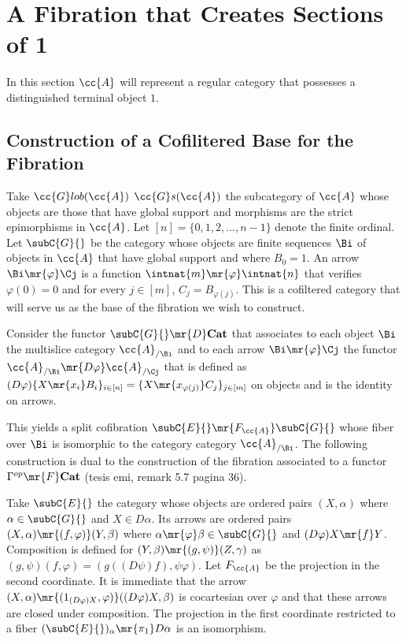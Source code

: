 

\section{A Fibration that Creates Sections of 1}
In this section $\cc{A}$ will represent a regular category that possesses a distinguished terminal object $1$.

\subsection{Construction of a Cofilitered Base for the Fibration}



Take $\cc{G}lob(\cc{A})$ $\cc{G}s(\cc{A})$ the subcategory of $\cc{A}$ whose objects are those that have global support and morphisms are the strict epimorphisms in $\cc{A}$. Let $[n]=\{0,1,2,...,n-1\}$ denote the finite ordinal. Let $\subC{G}{}$ be the category whose objects are finite sequences $\Bi$ of objects in $\cc{A}$ that have global support and where $B_0=1$. An arrow  ${\Bi \mr{\varphi} \Cj}$ is a function ${ \intnat{m} \mr{\varphi} \intnat{n}}$ that verifies ${\varphi(0)=0}$ and for every $j \in [m]$, ${C_j=B_{\varphi(j)}}$. This is a cofiltered category that will serve us as the base of the fibration we wish to construct. 

Consider the functor $\subC{G}{} \mr{D} \textbf{Cat}$ that associates to each object $\Bi$ the multislice category $\cc{A}_{/\Bi}$ and to each arrow ${\Bi \mr{\varphi} \Cj}$ the functor ${\cc{A}_{/\Bi} \mr{D\varphi} \cc{A}_{/\Cj}}$ that is defined as ${(D\varphi)\{X \mr{x_i} B_i\}_{i \in [n]}=\{X \mr{x_{\varphi(j)}} C_j\}_{j \in [m]}}$ on objects and is the identity on arrows.

\begin{remark}\label{obtuvimos una cofibracion}
This yields a split cofibration ${\subC{E}{} \mr{F_{\cc{A}}} \subC{G}{}}$ whose fiber over $\Bi$ is isomorphic to the category category $\cc{A}_{/\Bi}$. The following construction is dual to the construction of the fibration  associated to a functor ${\Gamma^{op} \mr{F} \textbf{Cat}}$ (tesis emi, remark 5.7 pagina 36). 

Take $\subC{E}{}$ the category whose objects are ordered pairs $(X,\alpha)$  where ${\alpha \in \subC{G}{}}$ and $X \in D\alpha$. Its arrows are ordered pairs ${(X,\alpha) \mr{(f,\varphi)} (Y,\beta)}$ where $\alpha \mr{\varphi} \beta \in \subC{G}{}$ and $(D\varphi)X \mr{f} Y$. Composition is defined for ${(Y,\beta) \mr{(g,\psi)} (Z,\gamma)}$ as $(g,\psi)(f,\varphi)=(g((D\psi) f),\psi\varphi)$. Let $F_{\cc{A}}$ be the projection in the second coordinate. It is immediate that the arrow ${(X,\alpha)\mr{(1_{(D\varphi)X},\varphi)}((D\varphi)X,\beta)}$ is cocartesian over $\varphi$ and that these arrows are closed under composition. The projection in the first coordinate restricted to a fiber ${(\subC{E}{})_\alpha \mr{\pi_1} D\alpha}$ is an isomorphism.
\end{remark}

